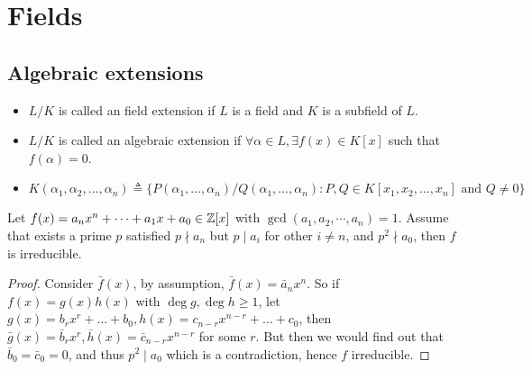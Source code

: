 \section{Fields}

\subsection{Algebraic extensions}

\begin{definition} \hfill
  \begin{itemize}
    \item $L / K$ is called an field extension if $L$ is a field and $K$ is a subfield of $L$.
    \item $L / K$ is called an algebraic extension if $\forall \alpha \in L, \exists f(x) \in K[x]$
      such that $f(\alpha) = 0$.
    \item $K(\alpha_1, \alpha_2, \dots, \alpha_n) \triangleq \big\{ P(\alpha_1, \dots, \alpha_n)
      / Q(\alpha_1, \dots, \alpha_n) : P, Q \in K[x_1, x_2, \dots, x_n] \text{ and } Q \neq 0 \big\}$
  \end{itemize}
\end{definition}

\begin{theorem}
  Let $f(x) = a_n x^n + \dots + a_1 x + a_0 \in \mathbb{Z}[x]$ with $\gcd(a_1, a_2, \cdots, a_n) = 1$.
  Assume that exists a prime $p$ satisfied $p \nmid a_n$ but $p \mid a_i$ for other $i \neq n$,
  and $p^2 \nmid a_0$, then $f$ is irreducible.

  \begin{proof}
    Consider $\bar{f}(x)$, by assumption, $\bar{f}(x) = \bar{a}_n x^n$. So if $f(x) = g(x) h(x)$
    with $\deg g, \deg h \geq 1$, let $g(x) = b_r x^r + \dots + b_0, h(x) = c_{n-r} x^{n-r} + \dots + c_0$,
    then $\bar{g}(x) = \bar{b}_r x^r, \bar{h}(x) = \bar{c}_{n-r} x^{n-r}$ for some
    $r$. But then we would find out that $\bar{b}_0 = \bar{c}_0 = 0$, and thus $p^2 \mid a_0$
    which is a contradiction, hence $f$ irreducible.
  \end{proof}
\end{theorem}

